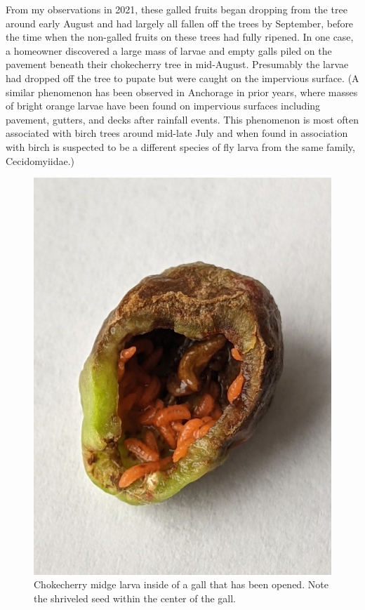 From my observations in 2021, these galled fruits began dropping from the tree around early August and had largely all fallen off the trees by September, before the time when the non-galled fruits on these trees had fully ripened. In one case, a homeowner discovered a large mass of larvae and empty galls piled on the pavement beneath their chokecherry tree in mid-August. Presumably the larvae had dropped off the tree to pupate but were caught on the impervious surface. (A similar phenomenon has been observed in Anchorage in prior years, where masses of bright orange larvae have been found on impervious surfaces including pavement, gutters, and decks after rainfall events. This phenomenon is most often associated with birch trees around mid-late July and when found in association with birch is suspected to be a different species of fly larva from the same family, Cecidomyiidae.)

\begin{figure}[H]
\begin{center}
\vspace{2mm}
\includegraphics[width=\textwidth]{img/midge_larvae.jpg}
\caption{Chokecherry midge larva inside of a gall that has been opened. Note the shriveled seed within the center of the gall.}
\label{midge_larvae}
\vspace{2mm}
\end{center}
\end{figure}


